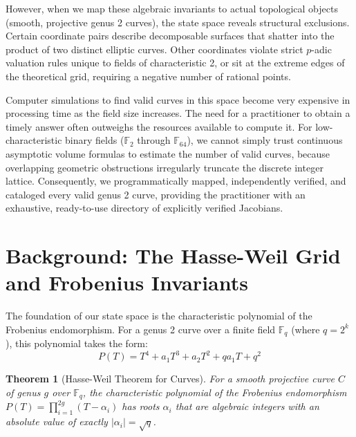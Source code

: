 \documentclass[letterpaper, 11pt]{article}
\newtheorem{theorem}{Theorem}[section]
\begin{document}
However, when we map these algebraic invariants to actual topological objects (smooth, projective genus 2 curves), the state space reveals structural exclusions. Certain coordinate pairs describe decomposable surfaces that shatter into the product of two distinct elliptic curves. Other coordinates violate strict $p$-adic valuation rules unique to fields of characteristic 2, or sit at the extreme edges of the theoretical grid, requiring a negative number of rational points.

Computer simulations to find valid curves in this space become very expensive in processing time as the field size increases. The need for a practitioner to obtain a timely answer often outweighs the resources available to compute it. For low-characteristic binary fields ($\mathbb{F}_2$ through $\mathbb{F}_{64}$), we cannot simply trust continuous asymptotic volume formulas to estimate the number of valid curves, because overlapping geometric obstructions irregularly truncate the discrete integer lattice. Consequently, we programmatically mapped, independently verified, and cataloged every valid genus 2 curve, providing the practitioner with an exhaustive, ready-to-use directory of explicitly verified Jacobians.

\section{Background: The Hasse-Weil Grid and Frobenius Invariants}
The foundation of our state space is the characteristic polynomial of the Frobenius endomorphism. For a genus 2 curve over a finite field $\mathbb{F}_q$ (where $q = 2^k$), this polynomial takes the form:
\[ P(T) = T^4 + a_1 T^3 + a_2 T^2 + q a_1 T + q^2 \]

\begin{theorem}[Hasse-Weil Theorem for Curves]
For a smooth projective curve $C$ of genus $g$ over $\mathbb{F}_q$, the characteristic polynomial of the Frobenius endomorphism $P(T) = \prod_{i=1}^{2g} (T - \alpha_i)$ has roots $\alpha_i$ that are algebraic integers with an absolute value of exactly $|\alpha_i| = \sqrt{q}$.
\end{theorem}
\end{document}

